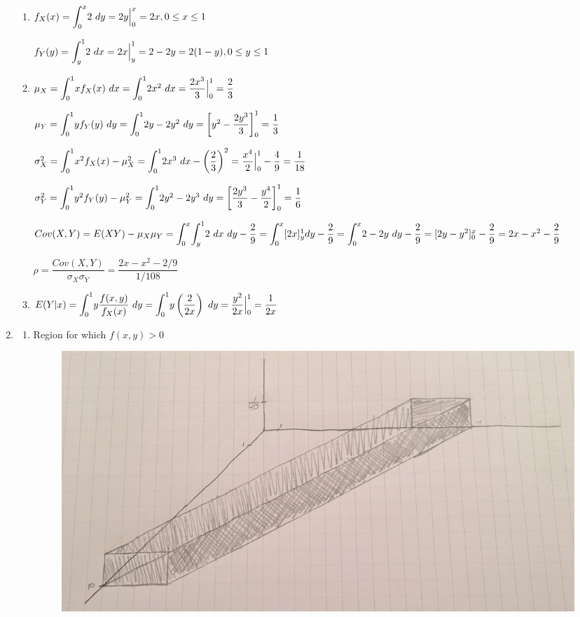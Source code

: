 \documentclass{article}
\newcommand\mfrac[2]{\left(\dfrac{#1}{#2}\right)}
\newcommand\lint{\mathlarger{\int}}
\begin{document}
\begin{enumerate}
      \begin{enumerate}
       \item
	$f_X(x) = \lint_0^x {2\ dy} = 2y \Big|_0^x = 2x, 0 \le x \le 1$
	
	$f_Y(y) = \lint_y^1 {2\ dx} = 2x \Big|_y^1 = 2 - 2y = 2(1-y), 0 \le y \le 1$
       
       \item
	$\mu_X = \lint_0^1 {x f_X(x)\ dx} = \lint_0^1 {2x^2\ dx} = \dfrac{2x^3}{3} \Big|_0^1
	  = \dfrac{2}{3}$ 
	  
	$\mu_Y = \lint_0^1 {y f_Y(y)\ dy} = \lint_0^1 {2y - 2y^2\ dy} = 
	  \left[y^2 - \dfrac{2y^3}{3}\right]_0^1 = \dfrac{1}{3}$
	  
	$\sigma_X^2 = \lint_0^1 {x^2 f_X(x)} - \mu_X^2 = \lint_0^1 {2x^3\ dx} - \mfrac{2}{3}^2= 
	  \dfrac{x^4}{2} \Big|_0^1 - \dfrac{4}{9} = \dfrac{1}{18}$
	  
	$\sigma_Y^2 = \lint_0^1 {y^2 f_Y(y)} - \mu_Y^2 = \lint_0^1 {2y^2 - 2y^3\ dy} = 
	  \left[\dfrac{2y^3}{3} - \dfrac{y^4}{2}\right]_0^1 = \dfrac{1}{6}$
	  
	$Cov(X,Y) = E(XY) - \mu_X \mu_Y = \lint_0^x \lint_y^1 {2\ dx\ dy} - \dfrac{2}{9} = 
	  \lint_0^x [2x]_y^1 dy - \dfrac{2}{9} = \lint_0^x {2 - 2y\ dy} - \dfrac{2}{9} \\ = 
	  [2y - y^2]_0^x - \dfrac{2}{9} = 2x - x^2 - \dfrac{2}{9}$
	  
	$\rho = \dfrac{Cov(X,Y)}{\sigma_X \sigma_Y} = \dfrac{2x - x^2 - 2/9}{1/108}$
       
       \item
	$E(Y|x) = \lint_0^1 {y \dfrac{f(x,y)}{f_X(x)}\ dy} = \lint_0^1 {y\mfrac{2}{2x}\ dy}
	= \dfrac{y^2}{2x}\Big|_0^1 = \dfrac{1}{2x}$
      \end{enumerate}

     \addtocounter{enumi}{3}
     
     \newpage
     \item
      \begin{enumerate}
       \item
	Region for which $f(x,y) > 0$
	\begin{figure}[h!]
	  \centering
	  \includegraphics[scale=.2,keepaspectratio=true]{./images/graph2.jpg}
	\end{figure}
       

\end{enumerate}
\end{enumerate}
\end{document}
